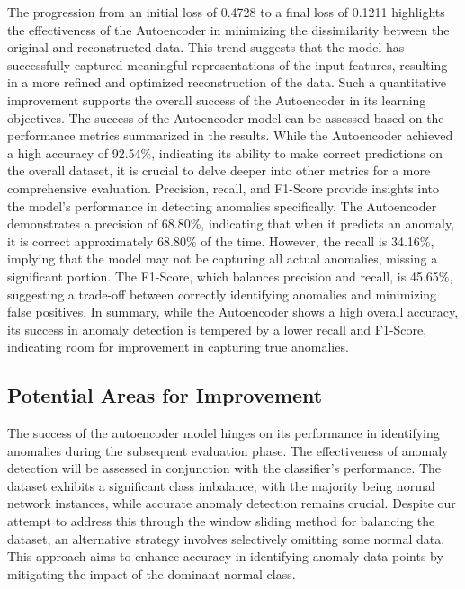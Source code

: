 \documentclass[10pt,twocolumn,letterpaper]{article}
\begin{document}
The progression from an initial loss of 0.4728 to a final loss of 0.1211 highlights the effectiveness of the Autoencoder in minimizing the dissimilarity between the 
original and reconstructed data. This trend suggests that the model has successfully captured meaningful representations of the input features, resulting in a more 
refined and optimized reconstruction of the data. Such a quantitative improvement supports the overall success of the Autoencoder in its learning objectives.
The success of the Autoencoder model can be assessed based on the performance metrics summarized in the results. While the Autoencoder achieved a high accuracy 
of 92.54\%, indicating its ability to make correct predictions on the overall dataset, it is crucial to delve deeper into other metrics for a more comprehensive evaluation.
Precision, recall, and F1-Score provide insights into the model's performance in detecting anomalies specifically. 
The Autoencoder demonstrates a precision of 68.80\%, indicating that when it predicts an anomaly, it is correct approximately 68.80\% of the time. 
However, the recall is 34.16\%, implying that the model may not be capturing all actual anomalies, missing a significant portion.
The F1-Score, which balances precision and recall, is 45.65\%, suggesting a trade-off between correctly identifying anomalies and minimizing false positives.
In summary, while the Autoencoder shows a high overall accuracy, its success in anomaly detection is tempered by a lower recall and F1-Score, indicating room for 
improvement in capturing true anomalies.

\subsection*{Potential Areas for Improvement}
The success of the autoencoder model hinges on its performance in identifying anomalies during the subsequent evaluation phase. 
The effectiveness of anomaly detection will be assessed in conjunction with the classifier's performance.
The dataset exhibits a significant class imbalance, with the majority being normal network instances, while accurate anomaly detection remains crucial. 
Despite our attempt to address this through the window sliding method for balancing the dataset, an alternative strategy involves selectively omitting some normal data. 
This approach aims to enhance accuracy in identifying anomaly data points by mitigating the impact of the dominant normal class.
\end{document}
